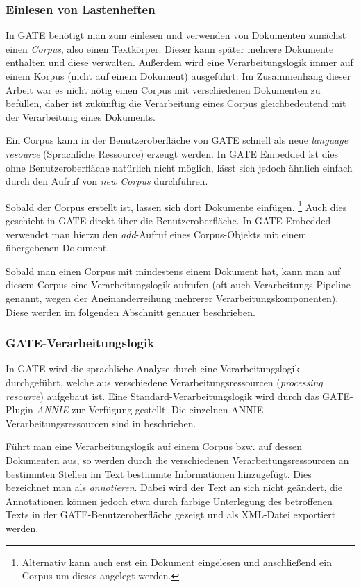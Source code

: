 \documentclass[12pt]{report}
\begin{document}
\subsubsection{Einlesen von Lastenheften}
In GATE benötigt man zum einlesen und verwenden von Dokumenten zunächst einen \textit{Corpus}, also einen Textkörper. Dieser kann später mehrere Dokumente enthalten und diese verwalten. Außerdem wird eine Verarbeitungslogik immer auf einem Korpus (nicht auf einem Dokument) ausgeführt. Im Zusammenhang dieser Arbeit war es nicht nötig einen Corpus mit verschiedenen Dokumenten zu befüllen, daher ist zukünftig die Verarbeitung eines Corpus gleichbedeutend mit der Verarbeitung eines Dokuments. 

Ein Corpus kann in der Benutzeroberfläche von GATE schnell als neue \textit{language resource} (Sprachliche Ressource) erzeugt werden. In GATE Embedded ist dies ohne Benutzeroberfläche natürlich nicht möglich, lässt sich jedoch ähnlich einfach durch den Aufruf von \textit{new Corpus} durchführen. 

Sobald der Corpus erstellt ist, lassen sich dort Dokumente einfügen. \footnote{Alternativ kann auch erst ein Dokument eingelesen und anschließend ein Corpus um dieses angelegt werden.} Auch dies geschieht in GATE direkt über die Benutzeroberfläche. In GATE Embedded verwendet man hierzu den \textit{add}-Aufruf eines Corpus-Objekts mit einem übergebenen Dokument. 

Sobald man einen Corpus mit mindestens einem Dokument hat, kann man auf diesem Corpus eine Verarbeitungslogik aufrufen (oft auch Verarbeitungs-Pipeline genannt, wegen der Aneinanderreihung mehrerer Verarbeitungskomponenten). Diese werden im folgenden Abschnitt genauer beschrieben.

\subsubsection{GATE-Verarbeitungslogik}
In GATE wird die sprachliche Analyse durch eine Verarbeitungslogik durchgeführt, welche aus verschiedene Verarbeitungsressourcen (\textit{processing resource}) aufgebaut ist. Eine Standard-Verarbeitungslogik wird durch das GATE-Plugin \textit{ANNIE} zur Verfügung gestellt. Die einzelnen ANNIE-Verarbeitungsressourcen sind in \cite{rs18} beschrieben. 

Führt man eine Verarbeitungslogik auf einem Corpus bzw. auf dessen Dokumenten aus, so werden durch die verschiedenen Verarbeitungsressourcen an bestimmten Stellen im Text bestimmte Informationen hinzugefügt. Dies bezeichnet man als \textit{annotieren}. Dabei wird der Text an sich nicht geändert, die Annotationen können jedoch etwa durch farbige Unterlegung des betroffenen Texts in der GATE-Benutzeroberfläche gezeigt und als XML-Datei exportiert werden. 
\end{document}

